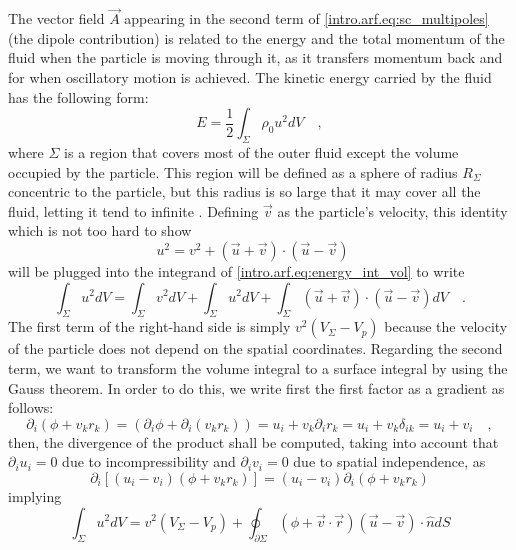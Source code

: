 The vector field $\vec A$ appearing in the second term of \eqref{intro.arf.eq:sc_multipoles} (the dipole contribution) is related to the energy and the total momentum of the fluid when the particle is moving through it, as it transfers momentum back and for when oscillatory motion is achieved. The kinetic energy carried by the fluid has the following form:
\begin{equation}\label{intro.arf.eq:energy_int_vol}
    E = \frac{1}{2}\int_{\Sigma} \rho_0 u^2 dV\quad,
\end{equation}
where $\Sigma$ is a region that covers most of the outer fluid except the volume occupied by the particle. This region will be defined as a sphere of radius $R_\Sigma$ concentric to the particle, but this radius is so large that it may cover all the fluid, letting it tend to infinite \cite[~p.27]{Landau}. Defining $\vec v$ as the particle's velocity, this identity which is not too hard to show
\begin{equation}
    u^2 = v^2 + (\vec u + \vec v)\cdot(\vec u - \vec v)\quad
\end{equation}
will be  plugged into the integrand of \eqref{intro.arf.eq:energy_int_vol} to write
\begin{equation}
    \int_{\Sigma} u^2 dV = \int_{\Sigma} v^2 dV + \int_{\Sigma} u^2 dV + \int_{\Sigma} (\vec u + \vec v)\cdot(\vec u - \vec v) dV\quad.
\end{equation}
The first term of the right-hand side is simply $v^2(V_\Sigma - V_p)$ because the velocity of the particle does not depend on the spatial coordinates. Regarding the second term, we want to transform the volume integral to a surface integral by using the Gauss theorem. In order to do this, we write first the first factor as a gradient as follows:
\begin{equation}
    \partial_i(\phi + v_k r_k) = (\partial_i\phi + \partial_i(v_k r_k)) = u_i + v_k\partial_i r_k = u_i + v_k\delta_{ik} = u_i + v_i\quad,
\end{equation}
then, the divergence of the product shall be computed, taking into account that $\partial_i u_i = 0$ due to incompressibility and $\partial_i v_i = 0$ due to spatial independence, as
\begin{equation}
    \partial_i[(u_i - v_i)(\phi + v_kr_k)] = (u_i - v_i)\partial_i(\phi + v_k r_k)
\end{equation}
implying
\begin{equation}\label{intro.arf.eq:energy_int_surf}
    \int_{\Sigma} u^2 dV = v^2(V_\Sigma - V_p) + \oint_{\partial\Sigma} (\phi + \vec v\cdot\vec r)(\vec u - \vec v)\cdot\hat n dS 
\end{equation}
